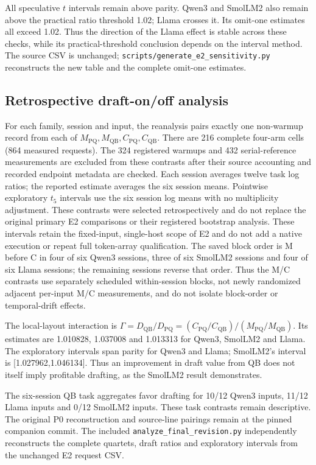 All speculative $t$ intervals remain above parity. Qwen3 and SmolLM2 also remain above the practical ratio threshold 1.02; Llama crosses it. Its omit-one estimates all exceed 1.02. Thus the direction of the Llama effect is stable across these checks, while its practical-threshold conclusion depends on the interval method. The source CSV is unchanged; \texttt{scripts/generate\_e2\_sensitivity.py} reconstructs the new table and the complete omit-one estimates.


\subsection{Retrospective draft-on/off analysis}
\label{supp:e2draft}
For each family, session and input, the reanalysis pairs exactly one non-warmup record from each of $M_{\mathrm{PQ}},M_{\mathrm{QB}},C_{\mathrm{PQ}},C_{\mathrm{QB}}$. There are 216 complete four-arm cells (864 measured requests). The 324 registered warmups and 432 serial-reference measurements are excluded from these contrasts after their source accounting and recorded endpoint metadata are checked. Each session averages twelve task log ratios; the reported estimate averages the six session means. Pointwise exploratory $t_5$ intervals use the six session log means with no multiplicity adjustment. These contrasts were selected retrospectively and do not replace the original primary E2 comparisons or their registered bootstrap analysis. These intervals retain the fixed-input, single-host scope of E2 and do not add a native execution or repeat full token-array qualification. The saved block order is M before C in four of six Qwen3 sessions, three of six SmolLM2 sessions and four of six Llama sessions; the remaining sessions reverse that order. Thus the M/C contrasts use separately scheduled within-session blocks, not newly randomized adjacent per-input M/C measurements, and do not isolate block-order or temporal-drift effects.

The local-layout interaction is $\Gamma=D_{\mathrm{QB}}/D_{\mathrm{PQ}}=(C_{\mathrm{PQ}}/C_{\mathrm{QB}})/(M_{\mathrm{PQ}}/M_{\mathrm{QB}})$. Its estimates are 1.010828, 1.037008 and 1.013313 for Qwen3, SmolLM2 and Llama. The exploratory intervals span parity for Qwen3 and Llama; SmolLM2's interval is [1.027962,1.046134]. Thus an improvement in draft value from QB does not itself imply profitable drafting, as the SmolLM2 result demonstrates.

The six-session QB task aggregates favor drafting for 10/12 Qwen3 inputs, 11/12 Llama inputs and 0/12 SmolLM2 inputs. These task contrasts remain descriptive. The original P0 reconstruction and source-line pairings remain at the pinned companion commit. The included \texttt{analyze\_final\_revision.py} independently reconstructs the complete quartets, draft ratios and exploratory intervals from the unchanged E2 request CSV.

